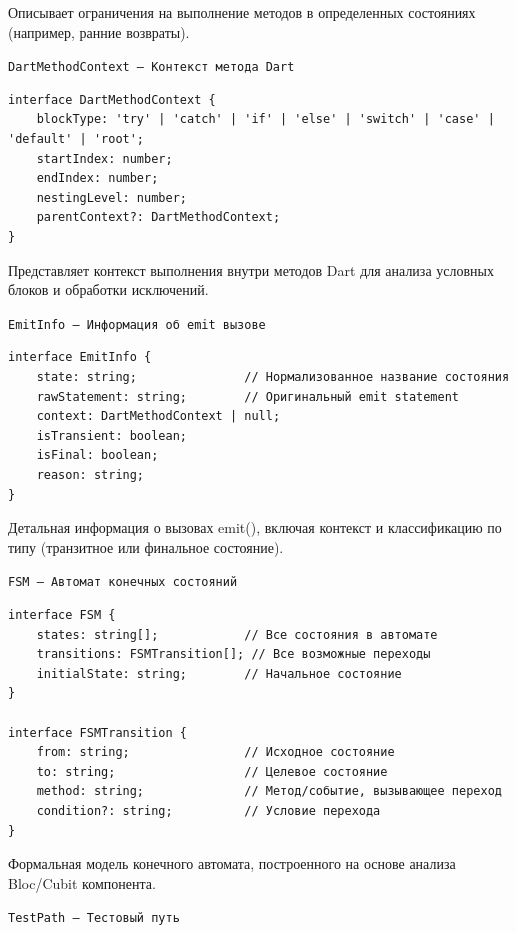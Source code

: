 \documentclass[14pt, russian]{scrartcl}
\begin{document}
Описывает ограничения на выполнение методов в определенных состояниях (например, ранние возвраты).

\texttt{DartMethodContext — Контекст метода Dart}

\begin{verbatim}
interface DartMethodContext {
    blockType: 'try' | 'catch' | 'if' | 'else' | 'switch' | 'case' | 'default' | 'root';
    startIndex: number;
    endIndex: number;
    nestingLevel: number;
    parentContext?: DartMethodContext;
}
\end{verbatim}

Представляет контекст выполнения внутри методов Dart для анализа условных блоков и обработки исключений.

\texttt{EmitInfo — Информация об emit вызове}

\begin{verbatim}
interface EmitInfo {
    state: string;               // Нормализованное название состояния
    rawStatement: string;        // Оригинальный emit statement  
    context: DartMethodContext | null;
    isTransient: boolean;
    isFinal: boolean;
    reason: string;
}
\end{verbatim}

Детальная информация о вызовах emit(), включая контекст и классификацию по типу (транзитное или финальное состояние).

\texttt{FSM — Автомат конечных состояний}

\begin{verbatim}
interface FSM {
    states: string[];            // Все состояния в автомате
    transitions: FSMTransition[]; // Все возможные переходы
    initialState: string;        // Начальное состояние
}

interface FSMTransition {
    from: string;                // Исходное состояние
    to: string;                  // Целевое состояние
    method: string;              // Метод/событие, вызывающее переход
    condition?: string;          // Условие перехода
}
\end{verbatim}

Формальная модель конечного автомата, построенного на основе анализа Bloc/Cubit компонента.

\texttt{TestPath — Тестовый путь}
\end{document}
